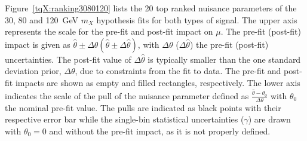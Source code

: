 Figure~\ref{tqX:ranking3080120} lists the 20 top ranked nuisance parameters of the 30, 80 and 120~GeV $m_X$ hypothesis fits for both types of signal. The upper axis represents the scale for the pre-fit and post-fit impact on $\mu$. The pre-fit (post-fit) impact is given as $\hat{\theta} \pm \Delta\theta (\hat{\theta} \pm \Delta\hat{\theta})$, with $\Delta\theta$ ($\Delta\hat{\theta}$) the pre-fit (post-fit) uncertainties. The post-fit value of $\Delta\hat{\theta}$ is typically smaller than the one standard deviation prior, $\Delta\theta$, due to constraints from the fit to data. The pre-fit and post-fit impacts are shown as empty and filled rectangles, respectively. The lower axis indicates the scale of the pull of the nuisance parameter defined as $\frac{\hat{\theta} -\theta_0}{\Delta\theta}$ with $\theta_0$ the nominal pre-fit value. The pulls are indicated as black points with their respective error bar while the single-bin statistical uncertainties ($\gamma$) are drawn with $\theta_0=0$ and without the pre-fit impact, as it is not properly defined.\\

